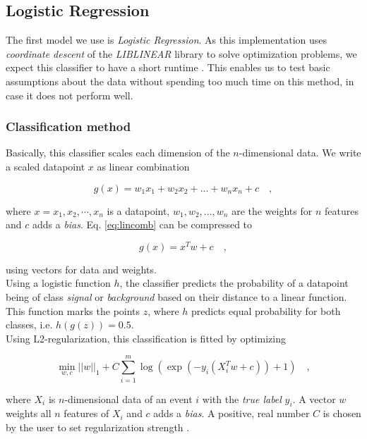 \subsection{Logistic Regression}\label{sec:logReg}
The first model we use is \emph{Logistic Regression}. As this implementation uses \emph{coordinate descent} of the \emph{LIBLINEAR} library to solve optimization problems, we expect this classifier to have a short runtime \cite{cdl2}. This enables us to test basic assumptions about the data without spending too much time on this method, in case it does not perform well.

\subsubsection{Classification method}
Basically, this classifier scales each dimension of the $n$-dimensional data. We write a scaled datapoint $x$ as linear combination

\begin{equation}
	\label{eq:lincomb}
	g(x)=w_1 x_1 + w_2 x_2 + ... + w_n x_n + c
	\mathrm{\hspace{1em},}
\end{equation}

where $x = {x_1,x_2, \cdots ,x_n}$ is a datapoint, $w_1,w_2,...,w_n$ are the weights for $n$ features and $c$ adds a \emph{bias}. Eq. \eqref{eq:lincomb} can be compressed to

\begin{equation}
	\label{eq:linvect}
	g(x)=x^T w + c
	\mathrm{\hspace{1em},}
\end{equation}

using vectors for data and weights.\\
Using a logistic function $h$, the classifier predicts the probability of a datapoint being of class \emph{signal} or \emph{background} based on their distance to a linear function. This function marks the points $z$, where $h$ predicts equal probability for both classes, i.e. $h(g(z))=0.5$.\\
Using  L2-regularization, this classification is fitted by optimizing

\begin{equation}
	\label{eq:l2}
	\operatorname*{\min}_{w,c} ||w||_1 + C \sum\limits_{i=1}^{m}\log(\exp(-y_i(X_i^{T} w + c )) + 1) \mathrm{\hspace{1em},}
\end{equation}

where $X_i$ is $n$-dimensional data of an event $i$ with the \emph{true label} $y_i$. A vector $w$ weights all $n$ features of $X_i$ and $c$ adds a \emph{bias}. A positive, real number $C$ is chosen by the user to set regularization strength \cite{sklearn}.

